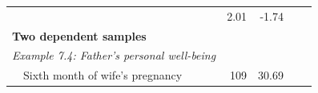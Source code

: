 \documentclass[11pt,a4paper,openany]{book}
\begin{document}
\begin{longtable}[]{@{}lrrrr@{}}
\begin{minipage}[t]{0.10\columnwidth}
\end{minipage} & \begin{minipage}[t]{0.07\columnwidth}\raggedleft\strut
2.01\strut
\end{minipage} & \begin{minipage}[t]{0.08\columnwidth}\raggedleft\strut
-1.74\strut
\end{minipage}\tabularnewline
\begin{minipage}[t]{0.55\columnwidth}\raggedright\strut
\textbf{Two dependent samples}\strut
\end{minipage} & \begin{minipage}[t]{0.06\columnwidth}\raggedleft\strut
\strut
\end{minipage} & \begin{minipage}[t]{0.10\columnwidth}\raggedleft\strut
\strut
\end{minipage} & \begin{minipage}[t]{0.07\columnwidth}\raggedleft\strut
\strut
\end{minipage} & \begin{minipage}[t]{0.08\columnwidth}\raggedleft\strut
\strut
\end{minipage}\tabularnewline
\begin{minipage}[t]{0.55\columnwidth}\raggedright\strut
\emph{Example 7.4: Father's personal well-being}\strut
\end{minipage} & \begin{minipage}[t]{0.06\columnwidth}\raggedleft\strut
\strut
\end{minipage} & \begin{minipage}[t]{0.10\columnwidth}\raggedleft\strut
\strut
\end{minipage} & \begin{minipage}[t]{0.07\columnwidth}\raggedleft\strut
\strut
\end{minipage} & \begin{minipage}[t]{0.08\columnwidth}\raggedleft\strut
\strut
\end{minipage}\tabularnewline
\begin{minipage}[t]{0.55\columnwidth}\raggedright\strut
~~Sixth month of wife's pregnancy\strut
\end{minipage} & \begin{minipage}[t]{0.06\columnwidth}\raggedleft\strut
109\strut
\end{minipage} & \begin{minipage}[t]{0.10\columnwidth}\raggedleft\strut
30.69\strut
\end{minipage} & \begin{minipage}[t]{0.07\columnwidth}\raggedleft\strut

\end{minipage}
\end{longtable}
\end{document}
